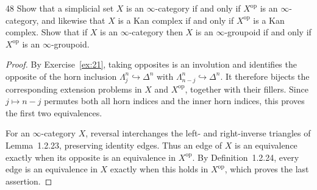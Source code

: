 \begin{exercise}{48}
Show that a simplicial set $X$ is an $\infty$-category if and only if $X^{\mathrm{op}}$ is an $\infty$-category,
and likewise that $X$ is a Kan complex if and only if $X^{\mathrm{op}}$ is a Kan complex. Show
that if $X$ is an $\infty$-category then $X$ is an $\infty$-groupoid if and only if $X^{\mathrm{op}}$ is an $\infty$-groupoid.

\begin{proof}
By Exercise~\ref{ex:21}, taking opposites is an involution
and identifies the opposite of the horn inclusion
$\Lambda^n_j\hookrightarrow\Delta^n$ with
$\Lambda^n_{n-j}\hookrightarrow\Delta^n$.
It therefore bijects the corresponding extension problems
in $X$ and $X^{\mathrm{op}}$, together with their fillers.
Since $j\mapsto n-j$ permutes both all horn indices and
the inner horn indices, this proves the first two equivalences.

For an $\infty$-category $X$, reversal interchanges the
left- and right-inverse triangles of Lemma~1.2.23,
preserving identity edges. Thus an edge of $X$ is an
equivalence exactly when its opposite is an equivalence
in $X^{\mathrm{op}}$.
By Definition~1.2.24, every edge is an equivalence in
$X$ exactly when this holds in $X^{\mathrm{op}}$,
which proves the last assertion.
\end{proof}
\end{exercise}
